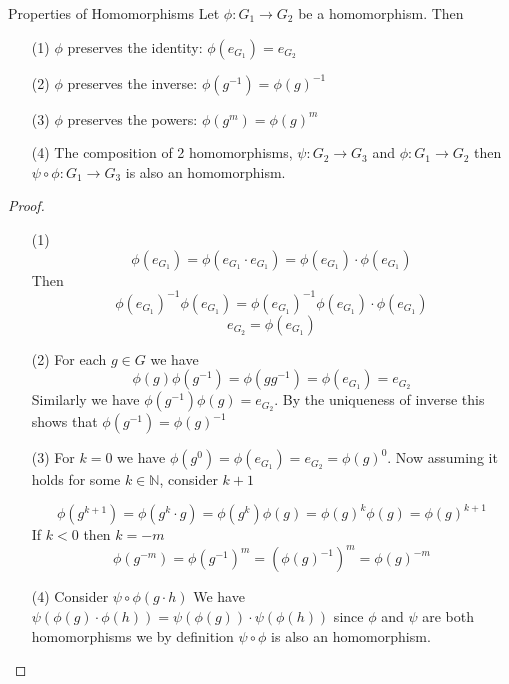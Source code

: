 \documentclass[16pt,a4paper]{article}
\theoremstyle{definition}
\begin{document}
\begin{thm}{Properties of Homomorphisms}{}
Let $\phi: G_1 \rightarrow G_2$ be a homomorphism. Then 
\begin{itemize}
\item[(1)] $\phi$ preserves the identity: $\phi(e_{G_1}) = e_{G_2}$
\item[(2)] $\phi$ preserves the inverse: $\phi(g^{-1}) = \phi(g)^{-1}$
\item[(3)] $\phi$ preserves the powers: $\phi(g^{m}) = \phi(g)^{m}$
\item[(4)] The composition of 2 homomorphisms,  $\psi : G_2\rightarrow G_3$ and $\phi : G_1 \rightarrow G_2$  then $\psi \circ \phi : G_1 \rightarrow G_3$ is also an homomorphism.  

\end{itemize} 
\end{thm}
\newpage
\begin{proof}
\begin{itemize}
\item[(1)] 
\[\phi(e_{G_1}) = \phi(e_{G_1}\cdot e_{G_1}) = \phi(e_{G_1}) \cdot \phi (e_{G_1})\]
Then \[\phi(e_{G_1})^{-1} \phi(e_{G_1}) = \phi(e_{G_1})^{-1} \phi(e_{G_1}) \cdot \phi (e_{G_1})\]
\[e_{G_2} = \phi(e_{G_1})\]


\item[(2)] For each $g\in G$ we have 
\[\phi(g)\phi(g^{-1}) = \phi(gg^{-1}) = \phi (e_{G_1}) = e_{G_2}\]
Similarly we have $\phi(g^{-1})\phi(g)=e_{G_2}$. By the uniqueness of inverse this shows that $\phi(g^{-1})=\phi(g)^{-1}$

\item[(3)] For $k=0$ we have $\phi(g^0) = \phi(e_{G_1}) = e_{G_2} = \phi(g)^0$. Now assuming it holds for some $k\in \mathbb{N}$, consider $k+1$

\[\phi(g^{k+1}) = \phi(g^k\cdot g) = \phi(g^k)\phi(g) = \phi(g)^k\phi(g) = \phi(g)^{k+1}\]
If $k<0$ then $k=-m$
\[\phi(g^{-m}) = \phi(g^{-1})^m = (\phi(g)^{-1})^m = \phi(g)^{-m}\]

\item[(4)] Consider $\psi\circ \phi(g\cdot h)$ We have $\psi(\phi(g)\cdot \phi(h)) = \psi(\phi(g))\cdot \psi(\phi(h))$ since $\phi$ and $\psi$ are both homomorphisms we by definition $\psi\circ \phi$ is also an homomorphism. 

\end{itemize}
\end{proof}
\end{document}
